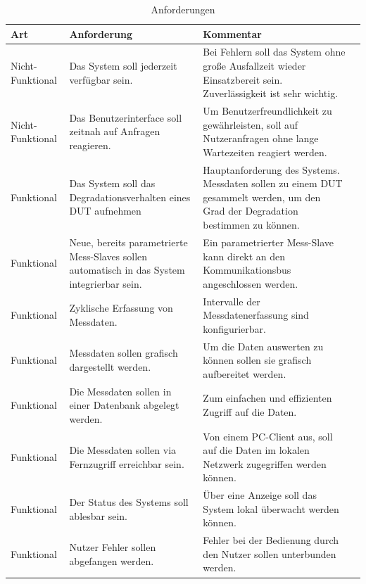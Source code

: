 \begin{table}[H]
\begin{center}
\begin{tabularx}{\textwidth}{|p{3cm}|X|X|X|}\hline
Art & Anforderung & Kommentar \\ \hline
Nicht-Funktional & Das System soll jederzeit verfügbar sein. & Bei Fehlern soll das System ohne große Ausfallzeit wieder Einsatzbereit sein. Zuverlässigkeit ist sehr wichtig.\\ \hline
Nicht-Funktional & Das Benutzerinterface soll zeitnah auf Anfragen reagieren. & Um Benutzerfreundlichkeit zu gewährleisten, soll auf Nutzeranfragen ohne lange Wartezeiten reagiert werden. \\ \hline
Funktional & Das System soll das Degradationsverhalten eines \ac{DUT} aufnehmen & Hauptanforderung des Systems. Messdaten sollen zu einem \ac{DUT} gesammelt werden, um den Grad der Degradation bestimmen zu können. \\ \hline
Funktional & Neue, bereits parametrierte Mess-Slaves sollen automatisch in das System integrierbar sein. & Ein parametrierter Mess-Slave kann direkt an den Kommunikationsbus angeschlossen werden.\\ \hline
Funktional & Zyklische Erfassung von Messdaten. & Intervalle der Messdatenerfassung sind konfigurierbar.\\ \hline
Funktional & Messdaten sollen grafisch dargestellt werden. & Um die Daten auswerten zu können sollen sie grafisch aufbereitet werden.\\ \hline
Funktional & Die Messdaten sollen in einer Datenbank abgelegt werden. & Zum einfachen und effizienten Zugriff auf die Daten.\\ \hline
Funktional & Die Messdaten sollen via Fernzugriff erreichbar sein. & Von einem PC-Client aus, soll auf die Daten im lokalen Netzwerk zugegriffen werden können.\\ \hline
Funktional & Der Status des Systems soll ablesbar sein. & Über eine Anzeige soll das System lokal überwacht werden können.\\ \hline
Funktional & Nutzer Fehler sollen abgefangen werden. & Fehler bei der Bedienung durch den Nutzer sollen unterbunden werden.\\ \hline
\end{tabularx}
\caption{Anforderungen}
\label{table_Anforderungen}
\end{center}
\end{table}




